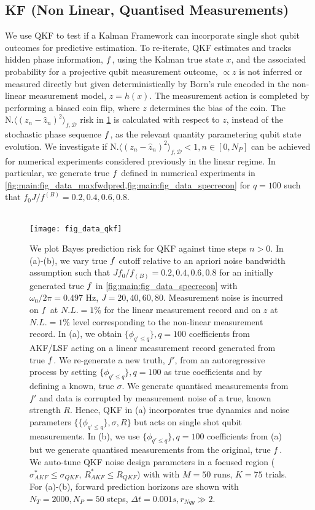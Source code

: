 \subsection{KF (Non Linear, Quantised Measurements)}
We use QKF to test if a Kalman Framework can incorporate single shot qubit outcomes for predictive estimation. To re-iterate, QKF estimates and tracks hidden phase information, $f$, using the Kalman true state $x$, and the associated probability for a projective qubit measurement outcome, $\propto z$ is not inferred or measured directly but given deterministically by Born's rule encoded in the non-linear measurement model, $z = h(x)$. The measurement action is completed by performing a biased coin flip, where $z$ determines the bias of the coin.  The $\text{N.} \langle (z_n - \hat{z}_n)^2 \rangle_{f, \mathcal{D}} $ risk in  \cref{fig:main:fig_data_qkf2} is calculated with respect to  $z$, instead of the stochastic phase sequence $f$, as the relevant quantity parametering qubit state evolution. We investigate if $\text{N.} \langle (z_n - \hat{z}_n)^2 \rangle_{f, \mathcal{D}} < 1, n\in [0, N_P] $ can be achieved for numerical experiments considered previously in the linear regime. In particular, we generate true $f$ defined in numerical experiments in \cref{fig:main:fig_data_maxfwdpred,fig:main:fig_data_specrecon} for $q=100$ such that $f_0 J / f^{(B)} = 0.2, 0.4, 0.6, 0.8$.  
\\
\\
\begin{figure}[h!]
    \texttt{[image: fig\_data\_qkf]}
    \caption{\label{fig:main:fig_data_qkf2} We plot Bayes prediction risk for QKF against time steps $n>0$. In (a)-(b), we vary true $f$ cutoff relative to an apriori noise bandwidth assumption such that $J f_0 / f_{(B)} = 0.2, 0.4, 0.6, 0.8$ for an initially generated true $f$ in \cref{fig:main:fig_data_specrecon} with $\omega_0/ 2\pi = 0.497 $ Hz, $J = 20, 40, 60, 80$. Measurement noise is incurred on $f$ at $N.L. = 1 \%$ for the linear measurement record and on $z$ at $N.L. = 1\%$ level corresponding to the non-linear measurement record. In (a), we obtain $\{\phi_{q' \leq q}\}, q=100$ coefficients from AKF/LSF acting on a linear measurement record generated from true $f$. We re-generate a new truth, $f'$, from an autoregressive process by setting $\{\phi_{q'\leq q}\}, q=100$ as true coefficients and by defining a known, true $\sigma$. We generate quantised measurements from $f'$ and data is corrupted by measurement noise of a true, known strength $R$. Hence, QKF in (a) incorporates true dynamics and noise parameters $\{\{\phi_{q' \leq q} \}, \sigma, R\}$ but acts on single shot qubit measurements. In (b), we use $\{\phi_{q' \leq q} \}, q=100$ coefficients from (a) but we generate quantised measurements from the original, true $f$. We auto-tune QKF noise design parameters in a focused region ($\sigma_{AKF}^* \leq \sigma_{QKF}$, $R_{AKF}^* \leq R_{QKF}$) with with $M=50$ runs, $K=75$ trials. For (a)-(b), forward prediction horizons are shown with $N_T = 2000, N_P = 50$ steps, $\Delta t = 0.001s, r_{Nqy}\gg 2$.}
\end{figure}
